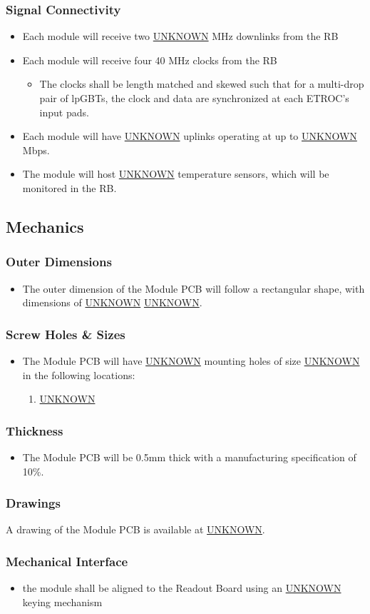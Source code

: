 \documentclass[11pt]{article}
\begin{document}
\subsubsection{Signal Connectivity}
\label{sec:orge7a7477}
\begin{itemize}
\item Each module will receive two \uline{UNKNOWN} MHz downlinks from the RB
\item Each module will receive four 40 MHz clocks from the RB
\begin{itemize}
\item The clocks shall be length matched and skewed such that for a multi-drop pair of lpGBTs, the clock and data are synchronized at each ETROC's input pads.
\end{itemize}
\item Each module will have \uline{UNKNOWN} uplinks operating at up to \uline{UNKNOWN} Mbps.
\item The module will host \uline{UNKNOWN} temperature sensors, which will be monitored in the RB.
\end{itemize}
\subsection{Mechanics}
\label{sec:org81f4448}
\subsubsection{Outer Dimensions}
\label{sec:org43a31b1}
\begin{itemize}
\item The outer dimension of the Module PCB will follow a rectangular shape, with dimensions of \uline{UNKNOWN} \texttimes{} \uline{UNKNOWN}.
\end{itemize}
\subsubsection{Screw Holes \& Sizes}
\label{sec:org5e11710}
\begin{itemize}
\item The Module PCB will have \uline{UNKNOWN} mounting holes of size \uline{UNKNOWN} in the following locations:
\begin{enumerate}
\item \uline{UNKNOWN}
\end{enumerate}
\end{itemize}
\subsubsection{Thickness}
\label{sec:org4608cd5}
\begin{itemize}
\item The Module PCB will be 0.5mm thick with a manufacturing specification of \textpm{} 10\%.
\end{itemize}
\subsubsection{Drawings}
\label{sec:orgfcad6f2}
A drawing of the Module PCB is available at \uline{UNKNOWN}.
\subsubsection{Mechanical Interface}
\label{sec:orgbec9825}
\begin{itemize}
\item the module shall be aligned to the Readout Board using an \uline{UNKNOWN} keying mechanism
\end{itemize}
\end{document}
